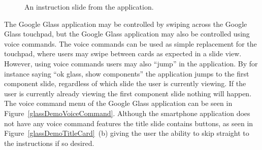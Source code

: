 	\begin{figure}[ht!]
		\centering
   		 \qquad
   		 \qquad
		\caption{An instruction slide from the application.}
		\label{glassDemoInstructionImage}
	\end{figure}
	
The Google Glass application may be controlled by swiping across the Google Glass touchpad, but the Google Glass application may also be controlled using voice commands. The voice commands can be used as simple replacement for the touchpad, where users may swipe between cards as expected in a slide view. However, using voice commands users may also ``jump'' in the application. By for instance saying ``ok glass, show components'' the application jumps to the first component slide, regardless of which slide the user is currently viewing. If the user is currently already viewing the first component slide nothing will happen. The voice command menu of the Google Glass application can be seen in Figure~\ref{glassDemoVoiceCommand}. Although the smartphone application does not have any voice command features the title slide contains buttons, as seen in Figure~\ref{glassDemoTitleCard}~(b) giving the user the ability to skip straight to the instructions if so desired.
	
